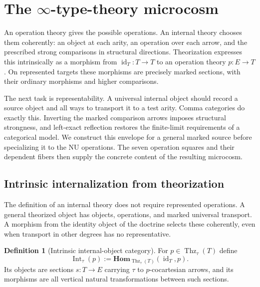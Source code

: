 \documentclass[oneside]{article}
\theoremstyle{plain}
\theoremstyle{definition}
\newtheorem{definition}[theorem]{Definition}
\theoremstyle{remark}
\newcommand{\Homc}{\mathbf{Hom}}
\newcommand{\Int}{\operatorname{Int}}
\newcommand{\Thz}{\operatorname{Thz}}
\newcommand{\id}{\operatorname{id}}
\begin{document}
\section{\texorpdfstring{The $\infty$-type-theory microcosm}{The infinity-type-theory microcosm}}\label{sec:microcosm}

An operation theory gives the possible operations. An internal theory
chooses them coherently: an object at each arity, an operation over each
arrow, and the prescribed strong comparisons in structural directions.
Theorization expresses this intrinsically as a morphism from
$\id_T:T\to T$ to an operation theory $p:E\to T$. On represented
targets these morphisms are precisely marked sections, with their
ordinary morphisms and higher comparisons.

The next task is representability. A universal internal object should
record a source object and all ways to transport it to a test arity.
Comma categories do exactly this. Inverting the marked comparison
arrows imposes structural strongness, and left-exact reflection restores
the finite-limit requirements of a categorical model. We construct this
envelope for a general marked source before specializing it to the NU
operations. The seven operation squares and their dependent fibers then
supply the concrete content of the resulting microcosm.

\subsection{Intrinsic internalization from theorization}
\label{subsec:unrepresented-internalization}

The definition of an internal theory does not require represented
operations. A general theorized object has objects, operations, and
marked universal transport. A morphism from the identity object of the
doctrine selects these coherently, even when transport in other degrees
has no representative.

\begin{definition}[Intrinsic internal-object category]
\label{def:general-internalization}
For $p\in\Thz_\tau(T)$ define
\[
 \Int_\tau(p):=
 \Homc_{\Thz_\tau(T)}(\id_T,p).
\]
Its objects are sections $s:T\to E$ carrying $\tau$ to
$p$-cocartesian arrows, and its morphisms are all vertical natural
transformations between such sections.
\end{definition}
\end{document}
